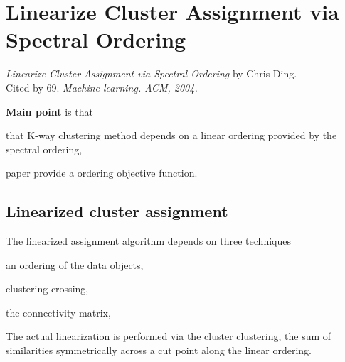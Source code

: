 \section{Linearize Cluster Assignment via Spectral Ordering}

\textit{Linearize Cluster Assignment via Spectral Ordering} by Chris Ding. \\
Cited by 69. \textit{Machine learning. ACM, 2004.}
\newline

\textbf{Main point} is that \begin{inparaenum}
\item that K-way clustering method depends on a linear ordering provided by the spectral ordering, 
\item paper provide a ordering objective function.
\end{inparaenum}

\subsection{Linearized cluster assignment}
The linearized assignment algorithm depends on three techniques \begin{inparaenum}
\item an ordering of the data objects, 
\item clustering crossing,
\item the connectivity matrix,
\end{inparaenum}

The actual linearization is performed via the cluster clustering, the sum of similarities symmetrically across a cut point along the linear ordering.

